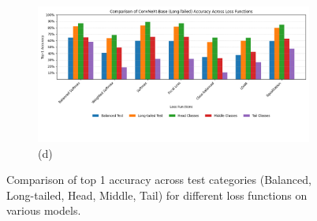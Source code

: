 \begin{figure}[h!]
    \begin{subfigure}{0.75\textwidth}
        \centering
        \includegraphics[width=\textwidth]{Images/Plots/convnext_lt_loss_comparison.png}
        \caption*{(d)}
        \label{fig:conv_lt_loss_comparison}
    \end{subfigure}

    \caption{Comparison of top 1 accuracy across test categories (Balanced, Long-tailed, Head, Middle, Tail) for different loss functions on various models.}
    \label{fig:lt_loss_comparison_all_models}
\end{figure}




